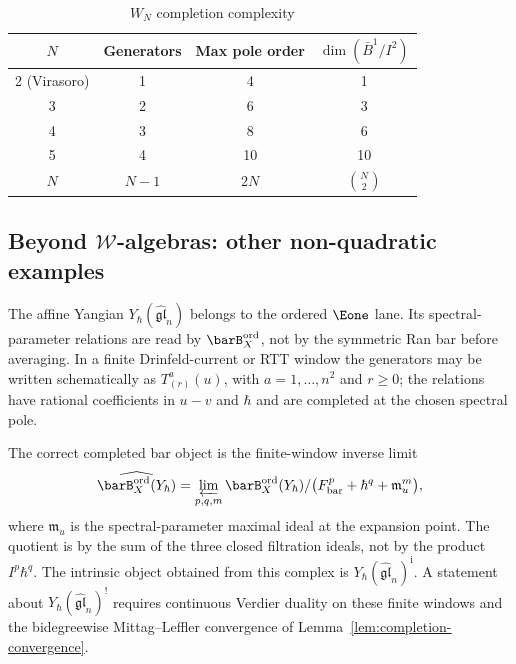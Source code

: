 \begin{table}[ht]
\centering
\caption{$W_N$ completion complexity}
\begin{tabular}{|c|c|c|c|}
\hline
$N$ & Generators & Max pole order & $\dim(\bar{B}^1/I^2)$ \\
\hline
2 (Virasoro) & 1 & 4 & 1 \\
3 & 2 & 6 & 3 \\
4 & 3 & 8 & 6 \\
5 & 4 & 10 & 10 \\
$N$ & $N-1$ & $2N$ & $\binom{N}{2}$ \\
\hline
\end{tabular}
\end{table}


\subsection{Beyond $\mathcal{W}$-algebras: other non-quadratic examples}

\begin{example}\label{ex:affine-yangian-kp}
\label{ex:yangian-completion}

The affine Yangian $Y_\hbar(\widehat{\mathfrak{gl}}_n)$ belongs to the
ordered $\Eone$ lane. Its spectral-parameter relations are read by
$\barB_X^{\mathrm{ord}}$, not by the symmetric Ran bar before averaging.
In a finite Drinfeld-current or RTT window the generators may be written
schematically as $T^a_{(r)}(u)$, with $a=1,\ldots,n^2$ and $r\ge0$; the
relations have rational coefficients in $u-v$ and $\hbar$ and are
completed at the chosen spectral pole.

The correct completed bar object is the finite-window inverse limit
\[
\widehat{\barB_X^{\mathrm{ord}}(Y_\hbar)}
=\varprojlim_{p,q,m}
\barB_X^{\mathrm{ord}}(Y_\hbar)/
\bigl(F_{\mathrm{bar}}^p+\hbar^q+\mathfrak m_u^m\bigr),
\]
where $\mathfrak m_u$ is the spectral-parameter maximal ideal at the
expansion point. The quotient is by the sum of the three closed
filtration ideals, not by the product $I^p\hbar^q$. The intrinsic object
obtained from this complex is
$Y_\hbar(\widehat{\mathfrak{gl}}_n)^{\mathrm i}$. A statement about
$Y_\hbar(\widehat{\mathfrak{gl}}_n)^!$ requires continuous Verdier
duality on these finite windows and the bidegreewise
Mittag--Leffler convergence of Lemma~\ref{lem:completion-convergence}.
\end{example}

